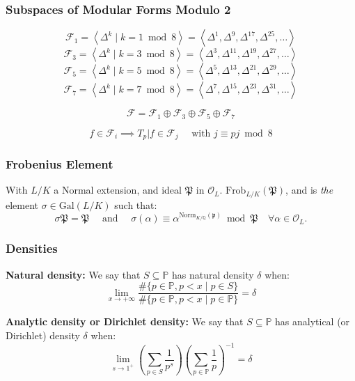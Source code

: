 \begin{frame}
	\frametitle{Subspaces of Modular Forms Modulo 2}
	$$
	\mathcal{F}_1
	= \left\langle \Delta^k \mid k = 1 \bmod 8 \right\rangle
	= \left\langle \Delta^1, \Delta^9, \Delta^{17}, \Delta^{25}, \dots \right\rangle
	$$
	$$
	\mathcal{F}_3
	= \left\langle \Delta^k \mid k = 3 \bmod 8 \right\rangle
	= \left\langle \Delta^3, \Delta^{11}, \Delta^{19}, \Delta^{27}, \dots \right\rangle
	$$
	$$
	\mathcal{F}_5
	= \left\langle \Delta^k \mid k = 5 \bmod 8 \right\rangle
	= \left\langle \Delta^5, \Delta^{13}, \Delta^{21}, \Delta^{29}, \dots \right\rangle
	$$
	$$
	\mathcal{F}_7
	= \left\langle \Delta^k \mid k = 7 \bmod 8 \right\rangle
	= \left\langle \Delta^7, \Delta^{15}, \Delta^{23}, \Delta^{31}, \dots \right\rangle
	$$
	
	$$
	\mathcal{F} = \mathcal{F}_1 \oplus \mathcal{F}_3 \oplus \mathcal{F}_5 \oplus \mathcal{F}_7
	$$
	
	\vspace{0.25cm}
	
	$$
	f \in \mathcal{F}_i \implies T_p|f \in \mathcal{F}_j
	\quad \text{ with } j \equiv pj \bmod 8
	$$
	
	\vspace{1cm}
\end{frame}

\begin{frame}
	\frametitle{Frobenius Element}
	With $L/K$ a Normal extension, and ideal $\mathfrak{P}$ in $\mathcal{O}_L$.
	$\text{Frob}_{L/K}(\mathfrak{P})$, and is \textit{the} element $\sigma \in \text{Gal}(L/K)$ such that:
	$$
	\sigma \mathfrak{P} = \mathfrak{P}
	\quad \text{ and } \quad
	\sigma(\alpha) \equiv \alpha^{\text{Norm}_{K/\mathbb{Q}}(\mathfrak{p})} \bmod{\mathfrak{P}} \quad \forall \alpha \in \mathcal{O}_L.
	$$
\end{frame}

\begin{frame}
	\frametitle{Densities}
	\textbf{Natural density:}
	We say that $S \subseteq \mathbb{P}$ has natural density $\delta$ when:
	$$
	\lim_{x \to +\infty}
	\frac{ \# \{ p \in \mathbb{P}, p < x \mid p \in S \}}
	{ \# \{ p \in \mathbb{P}, p < x \mid p \in \mathbb{P} \}} = \delta
	$$
	
	\vspace{0.5cm}
	
	\textbf{Analytic density or Dirichlet density:}
	We say that $S \subseteq \mathbb{P}$ has analytical (or Dirichlet) density $\delta$ when:
	$$
	\lim_{s \to 1^+}
	\left( \sum_{p \in S} \frac{1}{p^s} \right) 
	\left( \sum_{p \in \mathbb{P}} \frac{1}{p} \right)^{-1} = \delta
	$$
\end{frame}
